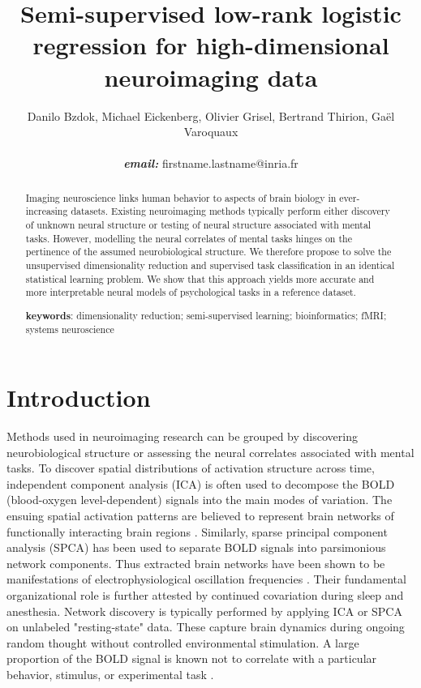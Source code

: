 \documentclass{article} %
\title{Semi-supervised low-rank logistic regression for
high-dimensional neuroimaging data}
\begin{document}
\author{Danilo Bzdok, Michael Eickenberg, Olivier Grisel,
  Bertrand Thirion,
  Ga\"el Varoquaux \\\\\textbf{\textit{email:} }firstname.lastname@inria.fr}

\maketitle

\begin{abstract}
Imaging neuroscience links human behavior to aspects of brain
biology in ever-increasing datasets.
%
Existing neuroimaging methods typically perform either discovery of unknown
neural structure or testing of neural structure associated with mental tasks.
%
However, modelling the neural correlates of mental tasks hinges
on the pertinence of the assumed neurobiological structure.
%
We therefore propose to solve the unsupervised dimensionality reduction
and supervised task classification in
an identical statistical learning problem.
%
We show that this approach yields more accurate and more interpretable
neural models of psychological tasks in a reference dataset.
%

\textbf{keywords}: dimensionality reduction; semi-supervised learning;
bioinformatics; fMRI; systems neuroscience

\end{abstract}

\section{Introduction}
%
Methods used in neuroimaging research can be grouped by discovering
neurobiological structure or assessing the neural correlates associated
with mental tasks.
To discover spatial distributions of activation structure across time,
independent component analysis (ICA) \cite{beckmann2005} is often used
to decompose the BOLD (blood-oxygen level-dependent) signals into the
main modes of variation.
The ensuing spatial activation patterns are believed to represent
brain networks of
functionally interacting brain regions \cite{smith2009}.
Similarly, sparse principal component analysis (SPCA) \cite{varoqu2011}
has been used to
separate BOLD signals into parsimonious network components.
Thus extracted brain networks have been shown to be
manifestations of electrophysiological oscillation frequencies \cite{hipp15}.
Their fundamental organizational role is further
attested by continued covariation during sleep and anesthesia.
%
Network discovery is typically performed by applying ICA or SPCA on
unlabeled "resting-state" data. These capture brain dynamics
during ongoing random thought without controlled environmental stimulation.
A large proportion of the BOLD signal is known
not to correlate with a particular behavior, stimulus, or experimental task
\cite{fox07}. 
\end{document}
